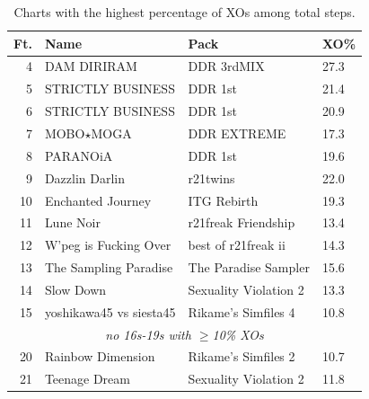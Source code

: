 \documentclass[10pt]{sigplanconf}
\begin{document}
\begin{table}[t]
	\begin{center}
		\small
	\begin{tabular}{r|l|l|l}
		\bf Ft. & \bf Name & \bf Pack & \bf XO\% \\
		\hline
		 4 & DAM DIRIRAM              & DDR 3rdMIX            & 27.3 \\
		 5 & STRICTLY BUSINESS        & DDR 1st               & 21.4 \\
		 6 & STRICTLY BUSINESS        & DDR 1st               & 20.9 \\
		 7 & MOBO$\star$MOGA          & DDR EXTREME           & 17.3 \\
		 8 & PARANOiA                 & DDR 1st               & 19.6 \\
		 9 & Dazzlin Darlin           & r21twins              & 22.0 \\
		10 & Enchanted Journey        & ITG Rebirth           & 19.3 \\
		11 & Lune Noir                & r21freak Friendship   & 13.4 \\
		12 & W'peg is Fucking Over    & best of r21freak ii   & 14.3 \\
		13 & The Sampling Paradise    & The Paradise Sampler  & 15.6 \\
		14 & Slow Down                & Sexuality Violation 2 & 13.3 \\
		15 & yoshikawa45 vs siesta45  & Rikame's Simfiles 4   & 10.8 \\
		\multicolumn{4}{c}{\em no 16s-19s with $\ge$10\% XOs} \\
		20 & Rainbow Dimension        & Rikame's Simfiles 2   & 10.7 \\
		21 & Teenage Dream            & Sexuality Violation 2 & 11.8 \\
	\end{tabular}
	\end{center}
	\caption{Charts with the highest percentage of XOs among total steps.}
\end{table}
\end{document}
